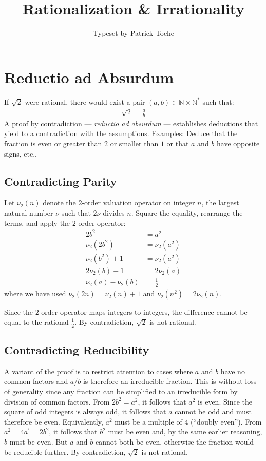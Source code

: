 \documentclass[12pt, a4]{article}
\title{Rationalization \& Irrationality}
\author{Typeset by Patrick Toche}
\begin{document}
\maketitle

\section*{Reductio ad Absurdum}
If $\sqrt{2}$ were rational, there would exist a pair $(a, b) \in \mathbb{N} \times \mathbb{N}^{*}$ such that:
\begin{align*}
\sqrt{2} = \frac{a}{b}
\end{align*}
A proof by contradiction --- \textit{reductio ad absurdum} --- establishes deductions that yield to a contradiction with the assumptions. Examples: Deduce that the fraction is even or greater than $2$ or smaller than $1$ or that $a$ and $b$ have opposite signs, etc..

\subsection*{Contradicting Parity} 
Let $\nu_{2}(n)$ denote the $2$-order valuation operator on integer $n$, the largest natural number $\nu$ such that $2\nu$ divides $n$. Square the equality, rearrange the terms, and apply the $2$-order operator:
\begin{align*}
2b^2 & = a^2 \\
\nu_{2}(2b^2) & = \nu_{2}(a^2) \\
\nu_{2}(b^2) + 1  & = \nu_{2}(a^2) \\
2\nu_{2}(b) + 1 & = 2\nu_{2}(a) \\
\nu_{2}(a) - \nu_{2}(b) & =  \frac{1}{2} 
\end{align*}
where we have used $\nu_{2}(2n)=\nu_{2}(n)+1$ and $\nu_{2}(n^2)=2\nu_{2}(n)$.

Since the $2$-order operator maps integers to integers, the difference cannot be equal to the rational $\frac{1}{2}$. By contradiction, $\sqrt{2}$ is not rational. 

\subsection*{Contradicting Reducibility}
A variant of the proof is to restrict attention to cases where $a$ and $b$ have no common factors and $a/b$ is therefore an irreducible fraction. This is without loss of generality since any fraction can be simplified to an irreducible form by division of common factors. From $2b^2 = a^2$, it follows that $a^2$ is even. Since the square of odd integers is always odd, it follows that $a$ cannot be odd and must therefore be even. Equivalently, $a^2$ must be a multiple of $4$ (``doubly even''). From $a^2 = 4 a^{\prime} = 2b^2$, it follows that $b^2$ must be even and, by the same earlier reasoning, $b$ must be even. But $a$ and $b$ cannot both be even, otherwise the fraction would be reducible further. By contradiction, $\sqrt{2}$ is not rational. 
\end{document}
